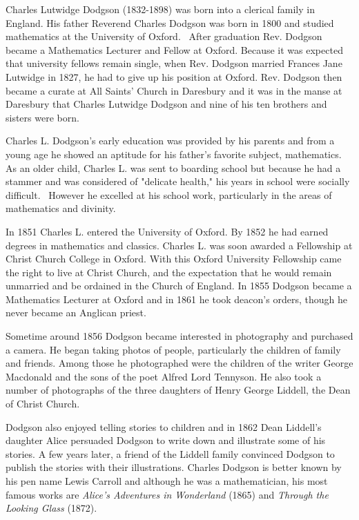 \documentclass[11pt]{article}%
\theoremstyle{definition}
\begin{document}
Charles Lutwidge Dodgson (1832-1898) was born into a clerical family in
England. His father Reverend Charles Dodgson was born in 1800 and studied
mathematics at the University of Oxford. \ After graduation Rev. Dodgson
became a Mathematics Lecturer and Fellow at Oxford. Because it was expected
that university fellows remain single, when Rev. Dodgson married Frances Jane
Lutwidge in 1827, he had to give up his position at Oxford. Rev. Dodgson then
became a curate at All Saints' Church in Daresbury and it was in the manse at
Daresbury that Charles Lutwidge Dodgson and nine of his ten brothers and
sisters were born.

Charles L. Dodgson's early education was provided by his parents and from a
young age he showed an aptitude for his father's favorite subject,
mathematics. As an older child, Charles L. was sent to boarding school but
because he had a stammer and was considered of "delicate health," his years in
school were socially difficult. \ However he excelled at his school work,
particularly in the areas of mathematics and divinity.

In 1851 Charles L. entered the University of Oxford. By 1852 he had earned
degrees in mathematics and classics. Charles L. was soon awarded a Fellowship
at Christ Church College in Oxford. With this Oxford University Fellowship
came the right to live at Christ Church, and the expectation that he would
remain unmarried and be ordained in the Church of England. In 1855 Dodgson
became a Mathematics Lecturer at Oxford and in 1861 he took deacon's orders,
though he never became an Anglican priest.

Sometime around 1856 Dodgson became interested in photography and purchased a
camera. He began taking photos of people, particularly the children of family
and friends. Among those he photographed were the children of the writer
George Macdonald and the sons of the poet Alfred Lord Tennyson. He also took a
number of photographs of the three daughters of Henry George Liddell, the Dean
of Christ Church.

Dodgson also enjoyed telling stories to children and in 1862 Dean Liddell's
daughter Alice persuaded Dodgson to write down and illustrate some of his
stories. A few years later, a friend of the Liddell family convinced Dodgson
to publish the stories with their illustrations. Charles Dodgson is better
known by his pen name Lewis Carroll and although he was a mathematician, his
most famous works are \textit{Alice's Adventures in Wonderland} (1865) and
\textit{Through the Looking Glass} (1872).
\end{document}
